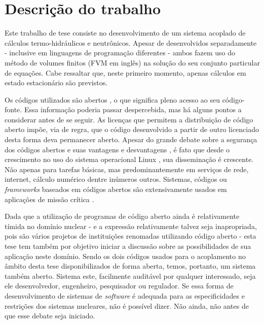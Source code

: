 \section{Descrição do trabalho}

Este trabalho de tese consiste no desenvolvimento de um sistema acoplado de cálculos
termo-hidráulicos e neutrônicos. Apesar de desenvolvidos separadamente - inclusive
em linguagens de programação diferentes - ambos fazem uso do método de volumes
finitos \cite{Eymard2003} (FVM em inglês) na solução do seu conjunto particular de equações.
Cabe ressaltar que, neste primeiro momento, apenas cálculos em estado estacionário
são previstos.

Os códigos utilizados são abertos \cite[Capítulo~3]{Stallman2002}, o que significa pleno acesso ao seu código-fonte.
Essa informação poderia passar despercebida, mas há alguns pontos a considerar antes de se
seguir. As licenças que permitem a distribuição de código aberto impõe, via de regra, que
o código desenvolvido a partir de outro licenciado desta forma deva permanecer aberto.
Apesar do grande debate sobre a segurança dos códigos abertos e suas vantagens e desvantagens \cite[Seção~2.6]{Androutsellis2010},
é fato que desde o crescimento no uso do sistema operacional Linux \cite{LinuxBritannica}, sua disseminação é crescente.
Não apenas para tarefas básicas, mas predominantemente em serviços de rede, internet, cálculo numérico dentre
inúmeros outros. Sistemas, códigos ou \textit{frameworks} baseados em códigos abertos são
extensivamente usados em aplicações de missão crítica \cite{Norris2004}.

Dada que a utilização de programas de código aberto ainda é relativamente tímida no domínio nuclear
- e a expressão relativamente talvez seja inapropriada, pois são vários projetos de instituições
renomadas utilizando código aberto \cite{Romano2013, Boyd2014, Huff2016} -
esta tese tem também por objetivo iniciar a discussão sobre as possibilidades de sua
aplicação neste domínio. Sendo os dois códigos usados para o acoplamento no âmbito desta tese disponibilizados
de forma aberta, temos, portanto, um sistema também aberto. Sistema este, facilmente auditável
por qualquer interessado, seja ele desenvolvedor, engenheiro, pesquisador ou regulador.
Se essa forma de desenvolvimento de sistemas de \textit{software} é adequada para as especificidades
e restrições dos sistemas nucleares, não é possível dizer. Não ainda, não antes de que esse debate
seja iniciado.

